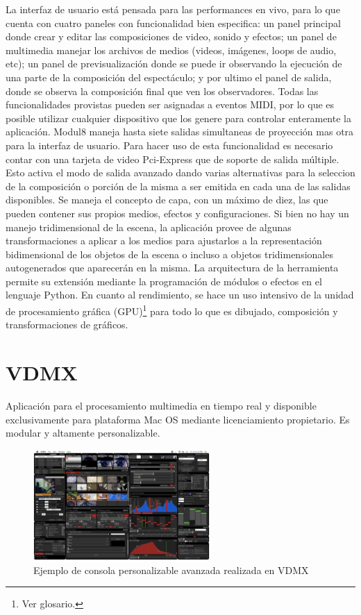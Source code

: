 La interfaz de usuario está pensada para las performances en vivo, para lo que cuenta con cuatro paneles con funcionalidad bien especifica: un panel principal donde crear y editar las composiciones de video, sonido y efectos; un panel de multimedia manejar los archivos de medios (videos, imágenes, loops de audio, etc); un panel de previsualización donde se puede ir observando la ejecución de una parte de la composición del espectáculo; y por ultimo el panel de salida, donde se observa la composición final que ven los observadores. Todas las funcionalidades provistas pueden ser asignadas a eventos MIDI, por lo que es posible utilizar cualquier dispositivo que los genere para controlar enteramente la aplicación.
Modul8 maneja hasta siete salidas simultaneas de proyección mas otra para la interfaz de usuario. Para hacer uso de esta funcionalidad es necesario contar con una tarjeta de video Pci-Express que de soporte de salida múltiple. Esto activa el modo de salida avanzado dando varias alternativas para la seleccion de la composición o porción de la misma a ser emitida en cada una de las salidas disponibles.
Se maneja el concepto de capa, con un máximo de diez, las que pueden contener sus propios medios, efectos y configuraciones.
Si bien no hay un manejo tridimensional de la escena, la aplicación provee de algunas transformaciones a aplicar a los medios para ajustarlos a la representación bidimensional de los objetos de la escena o incluso a objetos tridimensionales autogenerados que aparecerán en la misma.
La arquitectura de la herramienta permite su extensión mediante la programación de módulos o efectos en el lenguaje Python. En cuanto al rendimiento, se hace un uso intensivo de la unidad de procesamiento gráfica (GPU)\footnote{Ver glosario.} para todo lo que es dibujado, composición y transformaciones de gráficos.
\section{VDMX}
Aplicación para el procesamiento multimedia en tiempo real y disponible exclusivamente para plataforma Mac OS mediante licenciamiento propietario. Es modular y altamente personalizable.

\begin{figure}[H]
  \centering
    \includegraphics[width=0.6\textwidth]{./Cap3_aplicaciones/apps-vdmx.png}
  \caption{Ejemplo de consola personalizable avanzada realizada en VDMX\cite{VDMX}}
  \label{fig:Apps-VDMX}
\end{figure}


